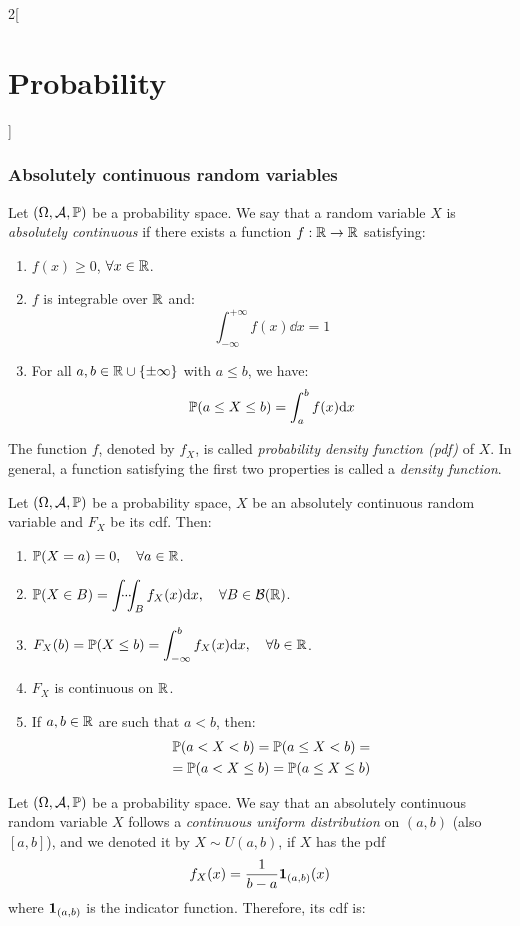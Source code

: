 \documentclass[../../../main.tex]{subfiles}
\begin{document}
\begin{multicols}{2}[\section{Probability}]
  \subsubsection{Absolutely continuous random variables}
  \begin{definition}
    Let $(\Omega,\mathcal{A},\mathbb{P})$ be a probability space. We say that a random variable $X$ is \textit{absolutely continuous} if there exists a function $f:\mathbb{R}\rightarrow\mathbb{R}$ satisfying:
    \begin{enumerate}
      \item $f(x)\geq 0$, $\forall x\in\mathbb{R}$.
      \item $f$ is integrable over $\mathbb{R}$ and: $$\int_{-\infty}^{+\infty}f(x)\dd x=1$$
      \item For all $a,b\in\mathbb{R}\cup\{\pm\infty\}$ with $a\leq b$, we have: $$\mathbb{P}(a\leq X\leq b)=\int_a^bf(x)\dd x$$
    \end{enumerate}
    The function $f$, denoted by $f_X$, is called \textit{probability density function (pdf)} of $X$. In general, a function satisfying the first two properties is called a \textit{density function}.
  \end{definition}
  \begin{prop}
    Let $(\Omega,\mathcal{A},\mathbb{P})$ be a probability space, $X$ be an absolutely continuous random variable and $F_X$ be its cdf. Then:
    \begin{enumerate}
      \item $\mathbb{P}(X=a)=0,\quad\forall a\in \mathbb{R}$.
      \item $\displaystyle \Prob(X\in B)=\dotsint_Bf_X(x)\dd x,\quad\forall B\in\mathcal{B}(\RR)$.
      \item $\displaystyle F_X(b)=\mathbb{P}(X\leq b)=\int_{-\infty}^bf_X(x)\dd x,\quad\forall b\in\mathbb{R}$.
      \item $F_X$ is continuous on $\mathbb{R}$.
      \item If $a,b\in\mathbb{R}$ are such that $a<b$, then:
            \begin{multline*}
              \mathbb{P}(a<X<b)=\mathbb{P}(a\leq X<b)=\\=\mathbb{P}(a<X\leq b)=\mathbb{P}(a\leq X\leq b)
            \end{multline*}
    \end{enumerate}
  \end{prop}
  \begin{definition}
    Let $(\Omega,\mathcal{A},\mathbb{P})$ be a probability space. We say that an absolutely continuous random variable $X$ follows a \textit{continuous uniform distribution} on $(a,b)$ (also $[a,b]$), and we denoted it by $X\sim U(a,b)$, if $X$ has the pdf $$f_X(x)=\frac{1}{b-a}\boldsymbol{\mathrm{1}}_{(a,b)}(x)$$ where $\boldsymbol{\mathrm{1}}_{(a,b)}$ is the indicator function. Therefore, its cdf is:

\end{definition}
\end{multicols}
\end{document}
